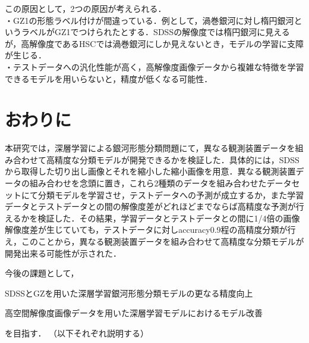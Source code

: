 \documentclass[a4j, 11pt]{jreport}
\begin{document}
この原因として，2つの原因が考えられる．\\
・GZ1の形態ラベル付けが間違っている．例として，渦巻銀河に対し楕円銀河というラベルがGZ1でつけられたとする．SDSSの解像度では楕円銀河に見えるが，高解像度であるHSCでは渦巻銀河にしか見えないとき，モデルの学習に支障が生じる．\\
・テストデータへの汎化性能が高く，高解像度画像データから複雑な特徴を学習できるモデルを用いらないと，精度が低くなる可能性．




\newpage
\chapter{おわりに}
本研究では，深層学習による銀河形態分類問題にて，異なる観測装置データを組み合わせて高精度な分類モデルが開発できるかを検証した．具体的には，SDSSから取得した切り出し画像とそれを縮小した縮小画像を用意．異なる観測装置データの組み合わせを念頭に置き，これら2種類のデータを組み合わせたデータセットにて分類モデルを学習させ，テストデータへの予測が成立するか，また学習データとテストデータとの間の解像度差がどれほどまでならば高精度な予測が行えるかを検証した．その結果，学習データとテストデータとの間に1/4倍の画像解像度差が生じていても，テストデータに対しaccuracy0.9程の高精度分類が行え，このことから，異なる観測装置データを組み合わせて高精度な分類モデルが開発出来る可能性が示された．

今後の課題として，
\begin{inparaenum}[(1)]
 \item SDSSとGZを用いた深層学習銀河形態分類モデルの更なる精度向上
 \item 高空間解像度画像データを用いた深層学習モデルにおけるモデル改善
\end{inparaenum}
を目指す．
（以下それぞれ説明する）



\newpage
\end{document}
